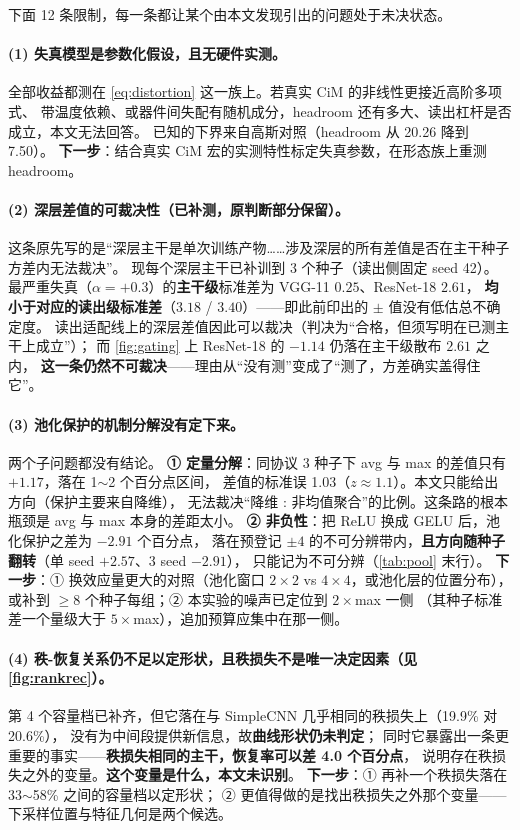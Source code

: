 \documentclass[11pt,a4paper]{ctexart}
\begin{document}
下面 12 条限制，每一条都让某个由本文发现引出的问题处于未决状态。

\paragraph{(1) 失真模型是参数化假设，且无硬件实测。}
全部收益都测在 \cref{eq:distortion} 这一族上。若真实 CiM 的非线性更接近高阶多项式、
带温度依赖、或器件间失配有随机成分，headroom 还有多大、读出杠杆是否成立，本文无法回答。
已知的下界来自高斯对照（headroom 从 20.26 降到 7.50）。
\textbf{下一步}：结合真实 CiM 宏的实测特性标定失真参数，在形态族上重测 headroom。

\paragraph{(2) 深层差值的可裁决性（已补测，原判断部分保留）。}
这条原先写的是“深层主干是单次训练产物……涉及深层的所有差值是否在主干种子方差内无法裁决”。
现每个深层主干已补训到 3 个种子（读出侧固定 seed 42）。
最严重失真（$\alpha=+0.3$）的\textbf{主干级}标准差为 VGG-11 $0.25$、ResNet-18 $2.61$，
\textbf{均小于对应的读出级标准差}（$3.18$ / $3.40$）——即此前印出的 $\pm$ 值没有低估总不确定度。
读出适配线上的深层差值因此可以裁决（判决为“合格，但须写明在已测主干上成立”）；
而 \cref{fig:gating} 上 ResNet-18 的 $-1.14$ 仍落在主干级散布 $2.61$ 之内，
\textbf{这一条仍然不可裁决}——理由从“没有测”变成了“测了，方差确实盖得住它”。

\paragraph{(3) 池化保护的机制分解没有定下来。}
两个子问题都没有结论。
\textbf{① 定量分解}：同协议 3 种子下 avg 与 max 的差值只有 $+1.17$，落在 1$\sim$2 个百分点区间，
差值的标准误 1.03（$z\approx1.1$）。本文只能给出方向（保护主要来自降维），
无法裁决“降维 : 非均值聚合”的比例。这条路的根本瓶颈是 avg 与 max 本身的差距太小。
\textbf{② 非负性}：把 ReLU 换成 GELU 后，池化保护之差为 $-2.91$ 个百分点，
落在预登记 $\pm4$ 的不可分辨带内，\textbf{且方向随种子翻转}（单 seed $+2.57$、3 seed $-2.91$），
只能记为不可分辨（\cref{tab:pool} 末行）。
\textbf{下一步}：① 换效应量更大的对照（池化窗口 $2\times2$ vs $4\times4$，或池化层的位置分布），
或补到 $\ge8$ 个种子每组；② 本实验的噪声已定位到 $2\times$max 一侧
（其种子标准差一个量级大于 $5\times$max），追加预算应集中在那一侧。

\paragraph{(4) 秩-恢复关系仍不足以定形状，且秩损失不是唯一决定因素（见 \cref{fig:rankrec}）。}
第 4 个容量档已补齐，但它落在与 SimpleCNN 几乎相同的秩损失上（19.9\% 对 20.6\%），
没有为中间段提供新信息，故\textbf{曲线形状仍未判定}；
同时它暴露出一条更重要的事实——\textbf{秩损失相同的主干，恢复率可以差 4.0 个百分点}，
说明存在秩损失之外的变量。\textbf{这个变量是什么，本文未识别}。
\textbf{下一步}：① 再补一个秩损失落在 33$\sim$58\% 之间的容量档以定形状；
② 更值得做的是找出秩损失之外那个变量——下采样位置与特征几何是两个候选。
\end{document}
